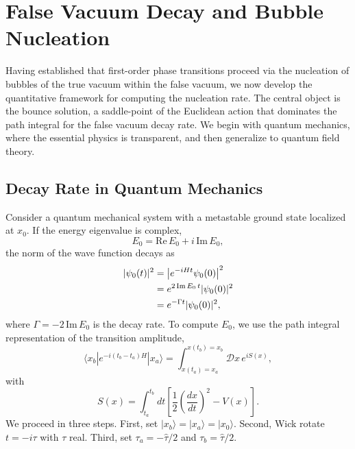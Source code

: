 \chapter{False Vacuum Decay and Bubble Nucleation}
\label{ch:vacuum-decay}

Having established that first-order phase transitions proceed via the
nucleation of bubbles of the true vacuum within the false vacuum, we
now develop the quantitative framework for computing the nucleation
rate. The central object is the bounce solution, a saddle-point of the
Euclidean action that dominates the path integral for the false vacuum
decay rate. We begin with quantum mechanics, where the essential
physics is transparent, and then generalize to quantum field theory.

\section{Decay Rate in Quantum Mechanics}

Consider a quantum mechanical system with a metastable ground state
localized at $x_0$. If the energy eigenvalue is complex,
\begin{equation}
    E_0 = \text{Re}\,E_0 + i\,\text{Im}\,E_0,
\end{equation}
the norm of the wave function decays as
\begin{align}
    |\psi_0(t)|^2 &= \left|e^{-iHt}\psi_0(0)\right|^2 \notag\\
    &= e^{2\,\text{Im}\,E_0\,t}|\psi_0(0)|^2 \notag\\
    &= e^{-\Gamma t}|\psi_0(0)|^2,
\end{align}
where $\Gamma = -2\,\text{Im}\,E_0$ is the decay rate. To compute
$E_0$, we use the path integral representation of the transition
amplitude,
\begin{equation}
    \langle x_b|e^{-i(t_b-t_a)H}|x_a\rangle
    = \int_{x(t_a)=x_a}^{x(t_b)=x_b}\mathcal{D}x\,e^{iS(x)},
    \label{eq:tr_amp}
\end{equation}
with
\begin{equation}
    S(x) = \int_{t_a}^{t_b}dt\left[
    \frac{1}{2}\left(\frac{dx}{dt}\right)^2 - V(x)\right].
\end{equation}
We proceed in three steps. First, set $|x_b\rangle = |x_a\rangle =
|x_0\rangle$. Second, Wick rotate $t = -i\tau$ with $\tau$ real.
Third, set $\tau_a = -\hat\tau/2$ and $\tau_b = \hat\tau/2$.

